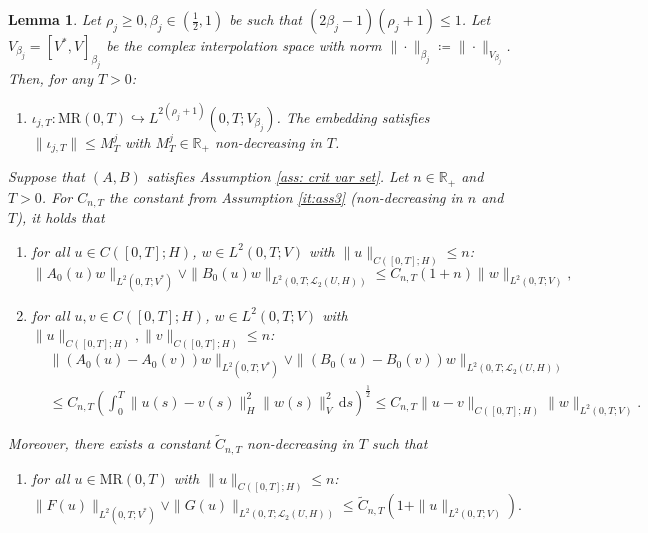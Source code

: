 \documentclass{amsart}
\newcommand{\dd}{\,\mathrm{d}}
\renewcommand{\MR}{\mathrm{MR}}
\newcommand{\UH}{\mathcal{L}_2(U,H)}
\newcommand{\<}{\langle}
\newcommand{\?}{\rangle}
\newcommand{\into}{\hookrightarrow}
\theoremstyle{plain}
\theoremstyle{remark}
\theoremstyle{plain}
\newtheorem{lemma}[theorem]{Lemma}
\numberwithin{equation}{section}
\def\R{{\mathbb R}}
\begin{document}
\begin{lemma}\label{lem: embeddings rho_j}
  Let $\rho_j\geq 0, \beta_j\in(\frac{1}{2},1)$ be such that $(2\beta_j-1)(\rho_j+1)\leq 1$. Let $V_{\beta_j}=[V^*,V]_{\beta_j}$ be the complex interpolation space with norm $\|\cdot\|_{\beta_j}\coloneqq \|\cdot\|_{V_{\beta_j}}$. Then, for any $T>0$:
  \begin{enumerate}[start, label=\emph{(\roman*)},ref=\textup{(\roman*)}]
    \item \label{it:emb1} $\iota_{\scriptscriptstyle j,T}:{\MR(0,T)}\into {L^{2(\rho_j+1)}(0,T;V_{\beta_j})}$. The embedding satisfies $\|\iota_{\scriptscriptstyle  j,T}\|\leq M_T^j$ with $M_T^j\in\R_+$ non-decreasing in $T$.
  \end{enumerate}
  Suppose that $(A,B)$ satisfies Assumption \ref{ass: crit var set}.
  Let $n\in\R_+$ and $T>0$. For $C_{n,T}$ the constant from Assumption \ref{it:ass3} (non-decreasing in $n$ and $T$), it holds that
  \begin{enumerate}[resume,label=\emph{(\roman*)},ref=\textup{(\roman*)}]
  \item \label{it:emb2} for all $u\in C([0,T];H)$, $w\in L^2(0,T;V)$ with $\|u\|_{C([0,T];H)}\leq n$:
  \begin{equation*}\label{eq: estimate A_0 B_0}
  \|A_0(u)w\|_{L^2(0,T;V^*)}\vee \|B_0(u)w\|_{L^2(0,T;\UH)}\leq C_{n,T}(1+n)\|w\|_{L^2(0,T;V)},
  \end{equation*}
  \item \label{it:emb3} for all $u,v\in C([0,T];H)$, $w\in L^2(0,T;V)$ with $\|u\|_{C([0,T];H)},\|v\|_{C([0,T];H)}\leq n$:
  \begin{align*}\label{eq: estimate A_0 B_0 difference}
  &\|(A_0(u)-A_0(v))w\|_{L^2(0,T;V^*)}\vee \|(B_0(u)-B_0(v))w\|_{L^2(0,T;\UH)}\\
  &\leq C_{n,T}\left(\int_0^T\|u(s)-v(s)\|_H^2\|w(s)\|_{V}^{2}\dd s\right)^{\frac{1}{2}}\leq C_{n,T}\|u-v\|_{C([0,T];H)}\|w\|_{L^2(0,T;V)}.
  \end{align*}
  \end{enumerate}
  Moreover, there exists a constant $\tilde{C}_{n,T}$ non-decreasing in $T$ such that
  \begin{enumerate}[resume,label=\emph{(\roman*)},ref=\textup{(\roman*)}]
    \item \label{it:emb4} for all $u\in\MR(0,T)$ with $\|u\|_{C([0,T];H)}\leq n$:
  \begin{equation*}\label{eq: estimate F G}
  \|F(u)\|_{L^2(0,T;V^*)}\vee \|G(u)\|_{L^2(0,T;\UH)}\leq \tilde{C}_{n,T}(1+\|u\|_{L^2(0,T;V)}).

\end{equation*}
\end{enumerate}
\end{lemma}
\end{document}
